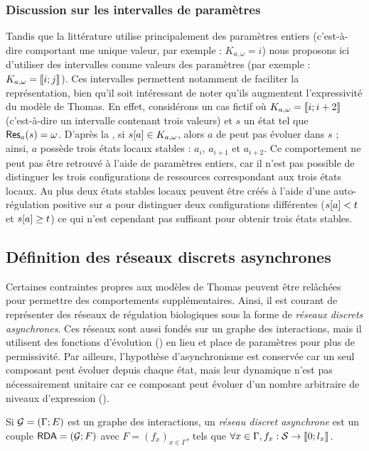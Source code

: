 \subsubsection*{Discussion sur les intervalles de paramètres}
Tandis que la littérature utilise principalement des paramètres entiers
(c'est-à-dire comportant une unique valeur, par exemple : $K_{a,\omega} = i$)
nous proposons ici d'utiliser des intervalles comme valeurs des paramètres
(par exemple : $K_{a,\omega} = \mathopen{\llbracket}i\mathclose{};j\mathclose{\rrbracket}$).
Ces intervalles permettent notamment de faciliter la représentation,
bien qu'il soit intéressant de noter qu'ils augmentent l'expressivité du modèle de Thomas.
En effet, considérons un cas fictif où $K_{a,\omega} = \mathopen{\llbracket}i\mathclose{};i+2\mathclose{\rrbracket}$
(c'est-à-dire un intervalle contenant trois valeurs) et $s$ un état tel que
$\mathsf{Res}_{a}(s) = \omega$.
D'après la , si ${s[a]} \in K_{a,\omega}$, alors $a$
de peut pas évoluer dans $s$ ; ainsi, $a$ possède trois états locaux stables :
$a_i$, $a_{i+1}$ et $a_{i+2}$.
Ce comportement ne peut pas être retrouvé à l'aide de paramètres entiers,
car il n'est pas possible de distinguer les trois configurations de ressources
correspondant aux trois états locaux.
Au plus deux états stables locaux peuvent être créés à l'aide d'une auto-régulation positive
sur $a$ pour distinguer deux configurations différentes
(${s[a]} < t$ et ${s[a]} \geq t$)
ce qui n'est cependant pas suffisant pour obtenir trois états stables.



\subsection{Définition des réseaux discrets asynchrones}

Certaines contraintes propres aux modèles de Thomas peuvent être relâchées pour permettre
des comportements supplémentaires.
Ainsi, il est courant de représenter des réseaux de régulation biologiques
sous la forme de \emph{réseaux discrets asynchrones}.
Ces réseaux sont aussi fondés sur un graphe des interactions,
mais il utilisent des fonctions d'évolution () en lieu et place de paramètres
pour plus de permissivité.
Par ailleurs, l'hypothèse d'asynchronisme est conservée car un seul composant peut évoluer
depuis chaque état,
mais leur dynamique n'est pas nécessairement unitaire 
car ce composant peut évoluer d'un nombre arbitraire de niveaux d'expression
().

\begin{definition}
  Si $\mathcal{G} = (\Gamma; E)$ est un graphe des interactions,
  un \emph{réseau discret asynchrone} est un couple $\mathsf{RDA} = (\mathcal{G}; F)$
  avec $F = (f_x)_{x \in \Gamma}$, tels que
  $\forall x \in \Gamma, f_x : \mathcal{S} \rightarrow \mathopen{\llbracket}0\mathclose{};l_x\mathclose{\rrbracket}$.
\end{definition}

